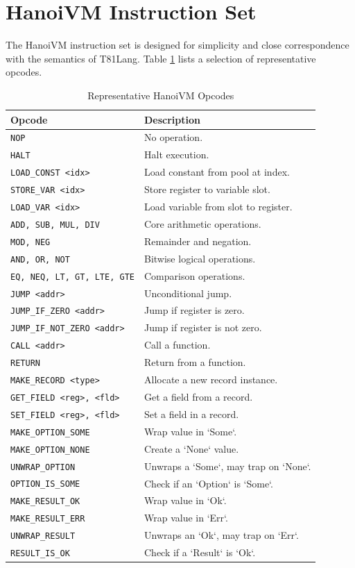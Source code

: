 \documentclass[sigconf, 10pt]{acmart}
\begin{document}
\section{HanoiVM Instruction Set}
The HanoiVM instruction set is designed for simplicity and close correspondence with the semantics of T81Lang. Table \ref{tab:hanoi_opcodes} lists a selection of representative opcodes.
\begin{table}[h]
\centering
\caption{Representative HanoiVM Opcodes}
\label{tab:hanoi_opcodes}
\begin{tabular}{|l|l|}
\hline
\textbf{Opcode} & \textbf{Description} \\
\hline
\texttt{NOP} & No operation. \\
\texttt{HALT} & Halt execution. \\
\texttt{LOAD\_CONST <idx>} & Load constant from pool at index. \\
\texttt{STORE\_VAR <idx>} & Store register to variable slot. \\
\texttt{LOAD\_VAR <idx>} & Load variable from slot to register. \\
\texttt{ADD, SUB, MUL, DIV} & Core arithmetic operations. \\
\texttt{MOD, NEG} & Remainder and negation. \\
\texttt{AND, OR, NOT} & Bitwise logical operations. \\
\texttt{EQ, NEQ, LT, GT, LTE, GTE} & Comparison operations. \\
\texttt{JUMP <addr>} & Unconditional jump. \\
\texttt{JUMP\_IF\_ZERO <addr>} & Jump if register is zero. \\
\texttt{JUMP\_IF\_NOT\_ZERO <addr>} & Jump if register is not zero. \\
\texttt{CALL <addr>} & Call a function. \\
\texttt{RETURN} & Return from a function. \\
\texttt{MAKE\_RECORD <type>} & Allocate a new record instance. \\
\texttt{GET\_FIELD <reg>, <fld>} & Get a field from a record. \\
\texttt{SET\_FIELD <reg>, <fld>} & Set a field in a record. \\
\texttt{MAKE\_OPTION\_SOME} & Wrap value in `Some`. \\
\texttt{MAKE\_OPTION\_NONE} & Create a `None` value. \\
\texttt{UNWRAP\_OPTION} & Unwraps a `Some`, may trap on `None`. \\
\texttt{OPTION\_IS\_SOME} & Check if an `Option` is `Some`. \\
\texttt{MAKE\_RESULT\_OK} & Wrap value in `Ok`. \\
\texttt{MAKE\_RESULT\_ERR} & Wrap value in `Err`. \\
\texttt{UNWRAP\_RESULT} & Unwraps an `Ok`, may trap on `Err`. \\
\texttt{RESULT\_IS\_OK} & Check if a `Result` is `Ok`. \\
\hline
\end{tabular}
\end{table}
\end{document}
